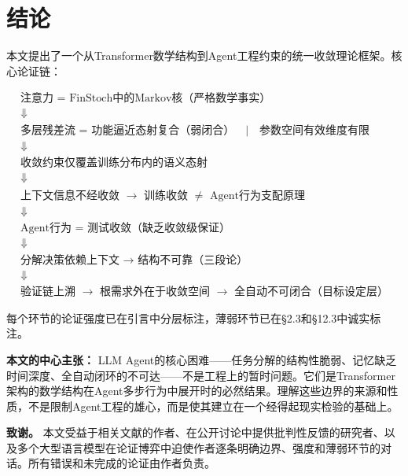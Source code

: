 \documentclass[11pt,a4paper]{ctexart}
\begin{document}
\section{结论}

本文提出了一个从Transformer数学结构到Agent工程约束的统一收敛理论框架。核心论证链：

\[
\boxed{
\begin{array}{c}
\text{注意力 = FinStoch中的Markov核（严格数学事实）} \\
\Downarrow \\
\text{多层残差流 = 功能逼近态射复合（弱闭合）} \quad | \quad \text{参数空间有效维度有限} \\
\Downarrow \\
\text{收敛约束仅覆盖训练分布内的语义态射} \\
\Downarrow \\
\text{上下文信息不经收敛 $\longrightarrow$ 训练收敛 $\neq$ Agent行为支配原理} \\
\Downarrow \\
\text{Agent行为 = 测试收敛（缺乏收敛级保证）} \\
\Downarrow \\
\text{分解决策依赖上下文 $\longrightarrow$ 结构不可靠（三段论）} \\
\Downarrow \\
\text{验证链上溯 $\longrightarrow$ 根需求外在于收敛空间 $\longrightarrow$ 全自动不可闭合（目标设定层）}
\end{array}
}
\]

每个环节的论证强度已在引言中分层标注，薄弱环节已在§2.3和§12.3中诚实标注。

\textbf{本文的中心主张：} LLM Agent的核心困难——任务分解的结构性脆弱、记忆缺乏时间深度、全自动闭环的不可达——不是工程上的暂时问题。它们是Transformer架构的数学结构在Agent多步行为中展开时的必然结果。理解这些边界的来源和性质，不是限制Agent工程的雄心，而是使其建立在一个经得起现实检验的基础上。

\vspace{12pt}
\noindent\textbf{致谢。} 本文受益于相关文献的作者、在公开讨论中提供批判性反馈的研究者、以及多个大型语言模型在论证博弈中迫使作者逐条明确边界、强度和薄弱环节的对话。所有错误和未完成的论证由作者负责。

\end{document}

